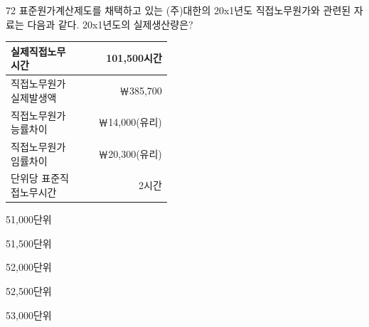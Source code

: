\begin{question}{72}
표준원가계산제도를 채택하고 있는 (주)대한의 20x1년도 직접노무원가와 관련된 자료는 다음과 같다. 20x1년도의 실제생산량은?
\par{\small\centering\begin{tabular}{|p{0.45\linewidth}|r|}
\hline
실제직접노무시간 & 101,500시간 \\ \hline
직접노무원가 실제발생액 & ￦385,700 \\ \hline
직접노무원가 능률차이 & ￦14,000(유리) \\ \hline
직접노무원가 임률차이 & ￦20,300(유리) \\ \hline
단위당 표준직접노무시간 & 2시간 \\ \hline
\end{tabular}\par}
\begin{choices}
  \item 51,000단위
  \item 51,500단위
  \item 52,000단위
  \item 52,500단위
  \item 53,000단위
\end{choices}
\end{question}
